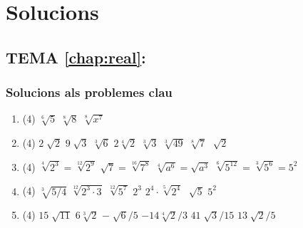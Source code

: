 \chapter*{Solucions}

\fontsize{11}{11.5}

\section*{TEMA \ref{chap:real}: }

\subsection*{Solucions als problemes clau \simbolclau}

 
\begin{enumerate}
	\item[\clauref{t1-r1}] 
	\begin{tasks}(4)
	\task $\sqrt[{6}]{5} $  \task  $\sqrt[{8}]{8} $  \task  $\sqrt[{8}]{x^{7} } $
	\end{tasks}
	
	\item[\clauref{t1-r2}] 
	\begin{tasks}(4)
\task  $2\sqrt[{}]{2} $    \task  $9\sqrt[{}]{3} $    \task  $\sqrt[{3}]{6} $   \task  $2\sqrt[{4}]{2} $   \task $\sqrt[{3}]{3} $    \task  $\sqrt[{3}]{49} $       \task  $\sqrt[{8}]{7} $    \task  $\sqrt[{}]{2} $
\end{tasks}
	
	\item[\clauref{t1-r3}] 
	\begin{tasks}(4)
	\task  $\sqrt[{4}]{2^{3} } =\sqrt[{12}]{2^{9} } $      \task  $\sqrt{7} =\sqrt[{16}]{7^{8} } $    \task  $\sqrt[{4}]{a^{6} } =\sqrt{a^{3} } $      \task  $\sqrt[{6}]{5^{12} } =\sqrt[{3}]{5^{6} } =5^{2} $
\end{tasks}

	\item[\clauref{t1-r4}]
	\begin{tasks}(4)
		 \task  $\sqrt[{3}]{5/4} $       \task  $\sqrt[{12}]{2^{3} \cdot 3} $    \task  $\sqrt[{12}]{5^{7} } $     \task  $2^{3} $      \task  $2^{4} \cdot \sqrt[{5}]{2^{4} } $     \task  $\sqrt[{}]{5} $            \task  $5^{2} $
	\end{tasks}
	
	\item[\clauref{t1-r5}]
	\begin{tasks}(4)
	  \task  $15\sqrt[{}]{11} $  \task  $6\sqrt[{3}]{2} $     \task  $-\sqrt[{}]{6} /5$     \task  $-14\sqrt[{4}]{2} /3$      \task  $41\sqrt[{}]{3} /15$    \task  $13\sqrt[{}]{2} /5$
\end{tasks}
	

\end{enumerate}
